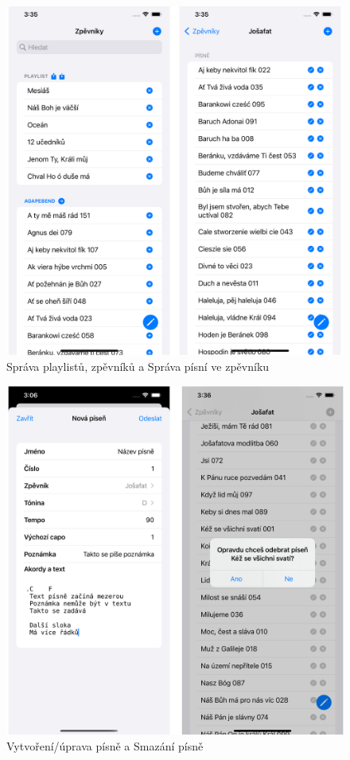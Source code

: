 
\begin{figure}
    \includegraphics[width=\textwidth]{images/C-ui/C-3-sprava-zpevniku-pisni.png}
    \caption{Správa playlistů, zpěvníků a Správa písní ve zpěvníku}
\end{figure}


\begin{figure}
    \includegraphics[width=\textwidth]{images/C-ui/C-4-nova-pisen-smazani-pisne.png}
    \caption{Vytvoření/úprava písně a Smazání písně}
\end{figure}

